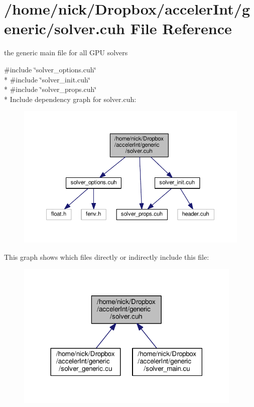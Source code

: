 \hypertarget{solver_8cuh}{}\section{/home/nick/\+Dropbox/acceler\+Int/generic/solver.cuh File Reference}
\label{solver_8cuh}


the generic main file for all G\+PU solvers  


{\ttfamily \#include \char`\"{}solver\+\_\+options.\+cuh\char`\"{}}\\*
{\ttfamily \#include \char`\"{}solver\+\_\+init.\+cuh\char`\"{}}\\*
{\ttfamily \#include \char`\"{}solver\+\_\+props.\+cuh\char`\"{}}\\*
Include dependency graph for solver.\+cuh\+:
\nopagebreak
\begin{figure}[H]
\begin{center}
\leavevmode
\includegraphics[width=350pt]{solver_8cuh__incl}
\end{center}
\end{figure}
This graph shows which files directly or indirectly include this file\+:
\nopagebreak
\begin{figure}[H]
\begin{center}
\leavevmode
\includegraphics[width=306pt]{solver_8cuh__dep__incl}
\end{center}
\end{figure}
